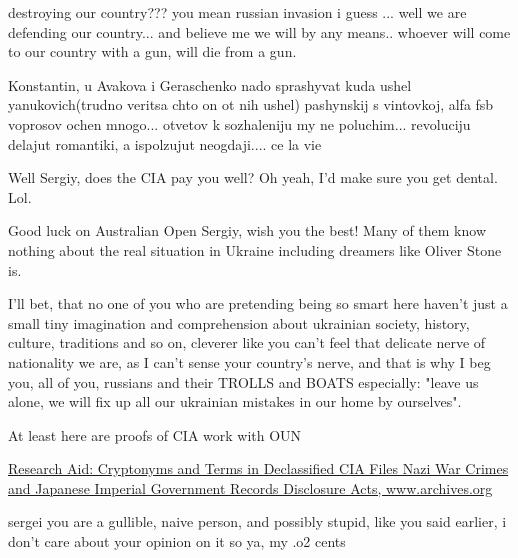 \begin{itemize}
\begin{itemize}

destroying our country??? you mean russian invasion i guess ... well we are
defending our country... and believe me we will by any means.. whoever will come
to our country with a gun, will die from a gun.


Konstantin, u Avakova i Geraschenko nado sprashyvat kuda ushel yanukovich(trudno
veritsa chto on ot nih ushel) pashynskij s vintovkoj, alfa fsb voprosov ochen
mnogo... otvetov k sozhaleniju my ne poluchim... revoluciju delajut romantiki, a
ispolzujut neogdaji.... ce la vie



Well Sergiy, does the CIA pay you well? Oh yeah, I'd make sure you get dental.
Lol.


Good luck on Australian Open Sergiy, wish you the best! Many of them know
nothing about the real situation in Ukraine including dreamers like Oliver
Stone is.


I'll bet, that no one of you who are pretending being so smart here haven't
just a small tiny imagination and comprehension about ukrainian society,
history, culture, traditions and so on, cleverer like you can't feel that
delicate nerve of nationality we are, as I can't sense your country's nerve,
and that is why I beg you, all of you, russians and their TROLLS and BOATS
especially: "leave us alone, we will fix up all our ukrainian mistakes in our
home by ourselves".


At least here are proofs of CIA work with OUN

\href{https://www.archives.gov/files/iwg/declassified-records/rg-263-cia-records/second-release-lexicon.pdf}{%
Research Aid: Cryptonyms and Terms in Declassified CIA Files %
Nazi War Crimes and Japanese Imperial Government Records Disclosure Acts, %
www.archives.org%
}


sergei you are a gullible, naive person, and possibly stupid, like you said
earlier, i don't care about your opinion on it so ya, my .o2 cents



\end{itemize}
\end{itemize}
